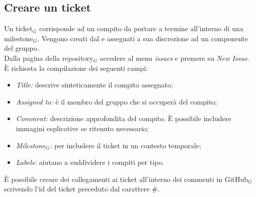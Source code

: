 \subsection{Creare un ticket}
Un ticket$_G$ corrisponde ad un compito da portare a termine all'interno di una milestone$_G$. Vengono creati dal \ruoloResponsabile{} e assegnati a sua discrezione ad un componente del gruppo. \\
Dalla pagina della repository$_G$ accedere al menu \textit{issues} e premere su \textit{New Issue}.\\
È richiesta la compilazione dei seguenti campi:
\begin{itemize}
    \item \textit{Title:} descrive sinteticamente il compito assegnato;
    \item \textit{Assigned to:} è il membro del gruppo che si occuperà del compito;
    \item \textit{Comment:} descrizione approfondita del compito. È possibile includere immagini esplicative se ritenuto necessario;
    \item \textit{Milestone$_G$:} per includere il ticket in un contesto temporale;
    \item \textit{Labels:} aiutano a suddividere i compiti per tipo.
\end{itemize}
È possibile creare dei collegamenti ai ticket all'interno dei commenti in GitHub$_G$ scrivendo l'id del ticket preceduto dal carattere \#.

